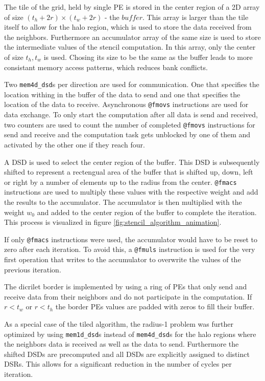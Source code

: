 \documentclass{article}
\begin{document}
The tile of the grid, held by single PE is stored in the center region of a 2D array of size $(t_h+2r)\times (t_w+2r)$ - the $buffer$. This array is larger than the tile itself to allow for the halo region, which is used to store the data received from the neighbors. Furthermore an accumulator array of the same size is used to store the intermediate values of the stencil computation. In this array, only the center of size $t_h, t_w$ is used. Chosing its size to be the same as the buffer leads to more consistant memory access patterns, which reduces bank conflicts.

Two \texttt{mem4d\_dsd}s per direction are used for communication. One that specifies the location withing in the buffer of the data to send and one that specifies the location of the data to receive.
Asynchronous \texttt{@fmovs} instructions are used for data exchange. To only start the computation after all data is send and received, two counters are used to count the number of completed \texttt{@fmovs} instructions for send and receive and the computation task gets unblocked by one of them and activated by the other one if they reach four.

A DSD is used to select the center region of the buffer. This DSD is subsequently shifted to represent a rectengual area of the buffer that is shifted up, down, left or right by a number of elements up to the radius from the center. \texttt{@fmacs} instructions are used to multiply these values with the respective weight and add the results to the accumulator. The accumulator is then multiplied with the weight $w_0$ and added to the center region of the buffer to complete the iteration. This process is visualized in figure \ref{fig:stencil_algorithm_animation}.

If only \texttt{@fmacs} instructions were used, the accumulator would have to be reset to zero after each iteration. To avoid this, a \texttt{@fmuls} instruction is used for the very first operation that writes to the accumulator to overwrite the values of the previous iteration.

The dicrilet border is implemented by using a ring of PEs that only send and receive data from their neighbors and do not participate in the computation. If $r<t_w$ or $r<t_h$ the border PEs values are padded with zeros to fill their buffer.

As a special case of the tiled algorithm, the radius-1 problem was further optimized by using \texttt{mem1d\_dsd}s instead of \texttt{mem4d\_dsd}s for the halo regions where the neighbors data is received as well as the data to send. Furthermore the shifted DSDs are precomputed and all DSDs are explicitly assigned to distinct DSRs. This allows for a significant reduction in the number of cycles per iteration.
\end{document}

